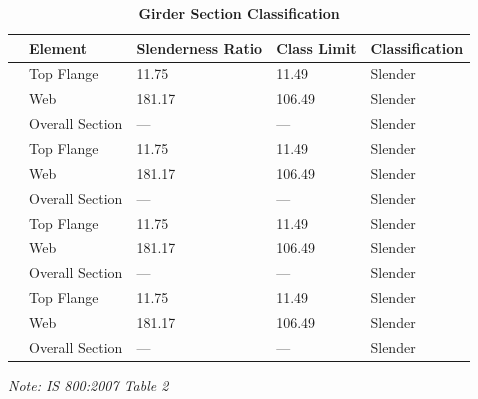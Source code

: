 \documentclass[12pt,a4paper]{report}
\numberwithin{table}{chapter}
\numberwithin{figure}{chapter}
\begin{document}
\vspace{1em}
\begin{longtable}{|C{2.5cm}|L{3cm}|C{3.5cm}|C{2.5cm}|>{\centering\arraybackslash}p{4.0cm}|}
\caption{\textbf{Girder Section Classification}}
\hline
\textbf{} & \textbf{Element} & \textbf{Slenderness Ratio} & \textbf{Class Limit} & \textbf{Classification} \\[6pt]
\hline
{} & Top Flange & 11.75 & 11.49 & Slender \\[6pt]
 & Web & 181.17 & 106.49 & Slender \\[6pt]
 & Overall Section & --- & --- & Slender \\[6pt]
\hline
{} & Top Flange & 11.75 & 11.49 & Slender \\[6pt]
 & Web & 181.17 & 106.49 & Slender \\[6pt]
 & Overall Section & --- & --- & Slender \\[6pt]
\hline
{} & Top Flange & 11.75 & 11.49 & Slender \\[6pt]
 & Web & 181.17 & 106.49 & Slender \\[6pt]
 & Overall Section & --- & --- & Slender \\[6pt]
\hline
{} & Top Flange & 11.75 & 11.49 & Slender \\[6pt]
 & Web & 181.17 & 106.49 & Slender \\[6pt]
 & Overall Section & --- & --- & Slender \\[6pt]
\hline
\end{longtable}
\noindent\textit{Note: IS 800:2007 Table 2}
\end{document}
